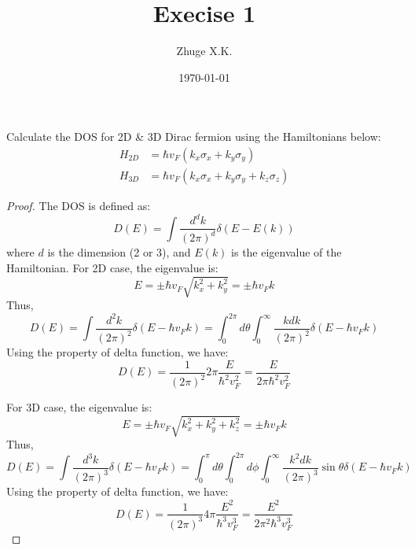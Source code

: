 \documentclass[11pt,a4paper]{article}
\title{Execise 1}
\author{Zhuge X.K.}
\date{\today}
\theoremstyle{plain}
\theoremstyle{definition}
\theoremstyle{remark}
\begin{document}
\maketitle

Calculate the DOS for 2D \& 3D Dirac fermion using the Hamiltonians below:
\begin{equation*}
    \begin{aligned}
        H_{2D} &= \hbar v_F (k_x \sigma_x + k_y \sigma_y) \\
        H_{3D} &= \hbar v_F (k_x \sigma_x + k_y \sigma_y + k_z \sigma_z)
    \end{aligned}
\end{equation*}
\begin{proof}
    The DOS is defined as:
    \begin{equation*}
        D(E) = \int \frac{d^d k}{(2\pi)^d} \delta(E - E(k))
    \end{equation*}
    where $d$ is the dimension (2 or 3), and $E(k)$ is the eigenvalue of the Hamiltonian. For 2D case, the eigenvalue is:
    \begin{equation*}
        E = \pm \hbar v_F \sqrt{k_x^2 + k_y^2} = \pm \hbar v_F k
    \end{equation*}
    Thus,
    \begin{equation*}
        D(E) = \int \frac{d^2 k}{(2\pi)^2} \delta(E - \hbar v_F k) = \int_0^{2\pi} d\theta \int_0^\infty \frac{k dk}{(2\pi)^2} \delta(E - \hbar v_F k)
    \end{equation*}
    Using the property of delta function, we have:
    \begin{equation*}
        D(E) = \frac{1}{(2\pi)^2} 2\pi \frac{E}{\hbar^2 v_F^2} = \frac{E}{2\pi \hbar^2 v_F^2}
    \end{equation*}

    For 3D case, the eigenvalue is:
    \begin{equation*}
        E = \pm \hbar v_F \sqrt{k_x^2 + k_y^2 + k_z^2} = \pm \hbar v_F k
    \end{equation*}
    Thus,
    \begin{equation*}
        D(E) = \int \frac{d^3 k}{(2\pi)^3} \delta(E - \hbar v_F k) = \int_0^{\pi} d\theta \int_0^{2\pi} d\phi \int_0^\infty \frac{k^2 dk}{(2\pi)^3} \sin\theta \delta(E - \hbar v_F k)
    \end{equation*}
    Using the property of delta function, we have:
    \begin{equation*}
        D(E) = \frac{1}{(2\pi)^3} 4\pi \frac{E^2}{\hbar^3 v_F^3} = \frac{E^2}{2\pi^2 \hbar^3 v_F^3}
    \end{equation*}
\end{proof}
\end{document}
